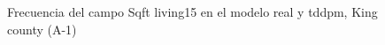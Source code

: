 \begin{figure}[H]
    \centering
    
    \caption{Frecuencia del campo Sqft living15 en el modelo real y tddpm, King county (A-1)}
    \label{frecuency-tddpm-sqft living15}
\end{figure}